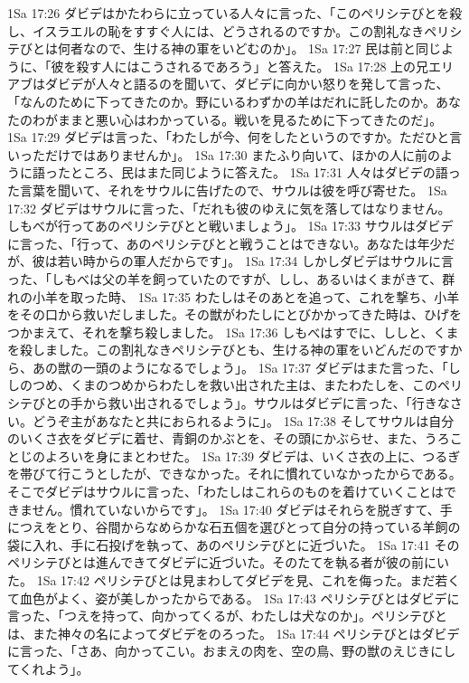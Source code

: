 1Sa 17:26  ダビデはかたわらに立っている人々に言った、「このペリシテびとを殺し、イスラエルの恥をすすぐ人には、どうされるのですか。この割礼なきペリシテびとは何者なので、生ける神の軍をいどむのか」。
1Sa 17:27  民は前と同じように、「彼を殺す人にはこうされるであろう」と答えた。
1Sa 17:28  上の兄エリアブはダビデが人々と語るのを聞いて、ダビデに向かい怒りを発して言った、「なんのために下ってきたのか。野にいるわずかの羊はだれに託したのか。あなたのわがままと悪い心はわかっている。戦いを見るために下ってきたのだ」。
1Sa 17:29  ダビデは言った、「わたしが今、何をしたというのですか。ただひと言いっただけではありませんか」。
1Sa 17:30  またふり向いて、ほかの人に前のように語ったところ、民はまた同じように答えた。
1Sa 17:31  人々はダビデの語った言葉を聞いて、それをサウルに告げたので、サウルは彼を呼び寄せた。
1Sa 17:32  ダビデはサウルに言った、「だれも彼のゆえに気を落してはなりません。しもべが行ってあのペリシテびとと戦いましょう」。
1Sa 17:33  サウルはダビデに言った、「行って、あのペリシテびとと戦うことはできない。あなたは年少だが、彼は若い時からの軍人だからです」。
1Sa 17:34  しかしダビデはサウルに言った、「しもべは父の羊を飼っていたのですが、しし、あるいはくまがきて、群れの小羊を取った時、
1Sa 17:35  わたしはそのあとを追って、これを撃ち、小羊をその口から救いだしました。その獣がわたしにとびかかってきた時は、ひげをつかまえて、それを撃ち殺しました。
1Sa 17:36  しもべはすでに、ししと、くまを殺しました。この割礼なきペリシテびとも、生ける神の軍をいどんだのですから、あの獣の一頭のようになるでしょう」。
1Sa 17:37  ダビデはまた言った、「ししのつめ、くまのつめからわたしを救い出された主は、またわたしを、このペリシテびとの手から救い出されるでしょう」。サウルはダビデに言った、「行きなさい。どうぞ主があなたと共におられるように」。
1Sa 17:38  そしてサウルは自分のいくさ衣をダビデに着せ、青銅のかぶとを、その頭にかぶらせ、また、うろことじのよろいを身にまとわせた。
1Sa 17:39  ダビデは、いくさ衣の上に、つるぎを帯びて行こうとしたが、できなかった。それに慣れていなかったからである。そこでダビデはサウルに言った、「わたしはこれらのものを着けていくことはできません。慣れていないからです」。
1Sa 17:40  ダビデはそれらを脱ぎすて、手につえをとり、谷間からなめらかな石五個を選びとって自分の持っている羊飼の袋に入れ、手に石投げを執って、あのペリシテびとに近づいた。
1Sa 17:41  そのペリシテびとは進んできてダビデに近づいた。そのたてを執る者が彼の前にいた。
1Sa 17:42  ペリシテびとは見まわしてダビデを見、これを侮った。まだ若くて血色がよく、姿が美しかったからである。
1Sa 17:43  ペリシテびとはダビデに言った、「つえを持って、向かってくるが、わたしは犬なのか」。ペリシテびとは、また神々の名によってダビデをのろった。
1Sa 17:44  ペリシテびとはダビデに言った、「さあ、向かってこい。おまえの肉を、空の鳥、野の獣のえじきにしてくれよう」。
